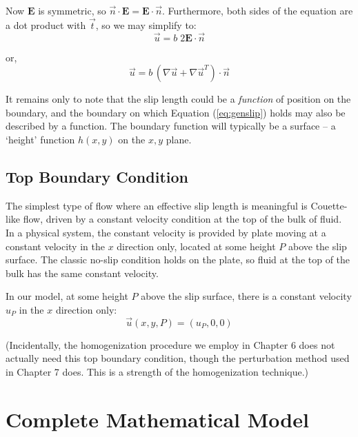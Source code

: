\documentclass[12pt, a4paper, twoside, openright]{book}
\begin{document}
Now $\mathbf{E}$ is symmetric, so $\vec{n} \cdot \mathbf{E} = \mathbf{E} \cdot \vec{n}$.  Furthermore, both sides of the equation are a dot product with $\vec{t}$, so we may simplify to:
\begin{equation}
\vec{u} = b \; 2 \mathbf{E} \cdot \vec{n}
\end{equation}

or,
\begin{equation}
\vec{u} = b \, (\nabla \vec{u} + \nabla \vec{u}^T) \cdot \vec{n}
\label{eq:genslip}
\end{equation}


\vspace{1em}

It remains only to note that the slip length could be a \emph{function} of position on the boundary, and the boundary on which Equation (\ref{eq:genslip}) holds may also be described by a function. The boundary function will typically be a surface -- a `height' function $h(x,y)$ on the $x,y$ plane.


\subsection{Top Boundary Condition}

The simplest type of flow where an effective slip length is meaningful is Couette-like flow, driven by a constant velocity condition at the top of the bulk of fluid.  In a physical system, the constant velocity is provided by plate moving at a constant velocity in the $x$ direction only, located at some height $P$ above the slip surface.  The classic no-slip condition holds on the plate, so fluid at the top of the bulk has the same constant velocity.

In our model, at some height $P$ above the slip surface, there is a constant velocity $u_P$ in the $x$ direction only:
\begin{equation}
\vec{u}(x,y,P) = (u_P,0,0)
\end{equation}

(Incidentally, the homogenization procedure we employ in Chapter 6 does not actually need this top boundary condition, though the perturbation method used in Chapter 7 does.  This is a strength of the homogenization technique.)

\section{Complete Mathematical Model}
\end{document}
